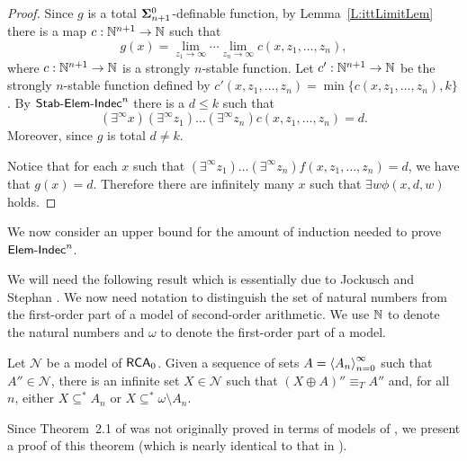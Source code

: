 \begin{proof}
Since  $g$ is a total $\mathbf{\Sigma}^0_{n+1}$-definable function,
by Lemma~\ref{L:ittLimitLem} there is a map $c:\mathbb{N}^{n+1}\to\mathbb{N}$ such that
$$g(x) = \lim_{z_1\to\infty} \cdots \lim_{z_n\to\infty} c(x,z_1,\dots,z_n),$$
where $c:\mathbb{N}^{n+1}\to\mathbb{N}$ is a strongly $n$-stable function.
Let $c':\mathbb{N}^{n+1}\to\mathbb{N}$ be the strongly $n$-stable function
defined by $c'(x,z_1,\dots,z_n)=\min\{c(x,z_1,\dots,z_n),k\}$.
By $\mathsf{Stab{\mbox{-}}Elem{\mbox{-}}Indec}^n$ there is a $d\leq k$ such that
$$(\exists^\infty x)(\exists^\infty z_1)\ldots(\exists^\infty z_n)c(x,z_1,\ldots, z_n)=d.$$
Moreover, since $g$ is total $d\neq k$.

Notice that for each $x$ such that $(\exists^\infty z_1)\ldots(\exists^\infty z_n)f(x,z_1,\ldots, z_n)=d$,
we have that $g(x)=d$.
Therefore there are infinitely many $x$ such that $\exists w\phi(x,d,w)$ holds.
\end{proof}

We now consider an upper bound for the amount of
induction needed to prove $\mathsf{Elem{\mbox{-}}Indec}^n$.

We will need the following result which is essentially due to Jockusch
and Stephan \cite{JockuschStephan}.
We now need notation to distinguish the set of natural numbers
from the first-order part of a model of second-order arithmetic.
We use $\mathbb{N}$ to denote the natural numbers and $\omega$
to denote the first-order part of a model.

\begin{lem}\label{L:JockuschStephan}
Let $\mathcal{N}$ be a model of $\mathsf{RCA}_0$.
Given a sequence of sets $A = \left\langle A_n\right\rangle_{n=0}^\infty$ such that
$A''\in\mathcal{N}$, there is an infinite set $X\in\mathcal{N}$ such that $(X \oplus A)''
\equiv_T A''$ and, for all $n$, either $X \subseteq^* A_n$ or
$X \subseteq^* \omega \setminus A_n$.
\end{lem}

\noindent
Since Theorem~2.1 of \cite{JockuschStephan} was not originally
proved in terms of models of \RCAo, we present a proof of this theorem
(which is nearly identical to that in \cite{JockuschStephan}).

